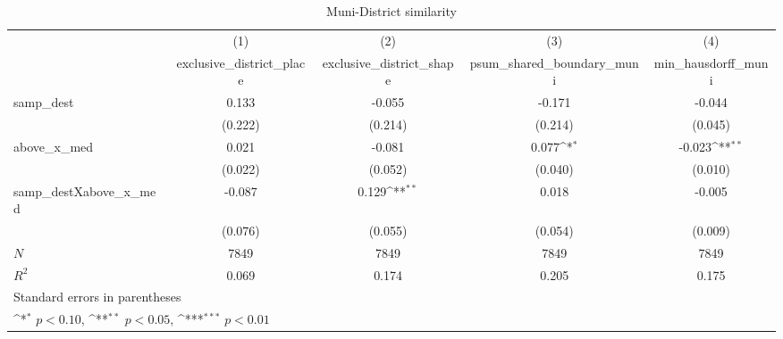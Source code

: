 \begin{table}[htbp]\centering
\def\sym#1{\ifmmode^{#1}\else\(^{#1}\)\fi}
\caption{Muni-District similarity}
\begin{tabular}{l*{4}{c}}
\hline\hline
            &\multicolumn{1}{c}{(1)}&\multicolumn{1}{c}{(2)}&\multicolumn{1}{c}{(3)}&\multicolumn{1}{c}{(4)}\\
            &\multicolumn{1}{c}{exclusive\_district\_place}&\multicolumn{1}{c}{exclusive\_district\_shape}&\multicolumn{1}{c}{psum\_shared\_boundary\_muni}&\multicolumn{1}{c}{min\_hausdorff\_muni}\\
\hline
samp\_dest   &       0.133         &      -0.055         &      -0.171         &      -0.044         \\
            &     (0.222)         &     (0.214)         &     (0.214)         &     (0.045)         \\
[1em]
above\_x\_med &       0.021         &      -0.081         &       0.077\sym{*}  &      -0.023\sym{**} \\
            &     (0.022)         &     (0.052)         &     (0.040)         &     (0.010)         \\
[1em]
samp\_destXabove\_x\_med&      -0.087         &       0.129\sym{**} &       0.018         &      -0.005         \\
            &     (0.076)         &     (0.055)         &     (0.054)         &     (0.009)         \\
\hline
\(N\)       &        7849         &        7849         &        7849         &        7849         \\
\(R^{2}\)   &       0.069         &       0.174         &       0.205         &       0.175         \\
\hline\hline
\multicolumn{5}{l}{\footnotesize Standard errors in parentheses}\\
\multicolumn{5}{l}{\footnotesize \sym{*} \(p<0.10\), \sym{**} \(p<0.05\), \sym{***} \(p<0.01\)}\\
\end{tabular}
\end{table}
